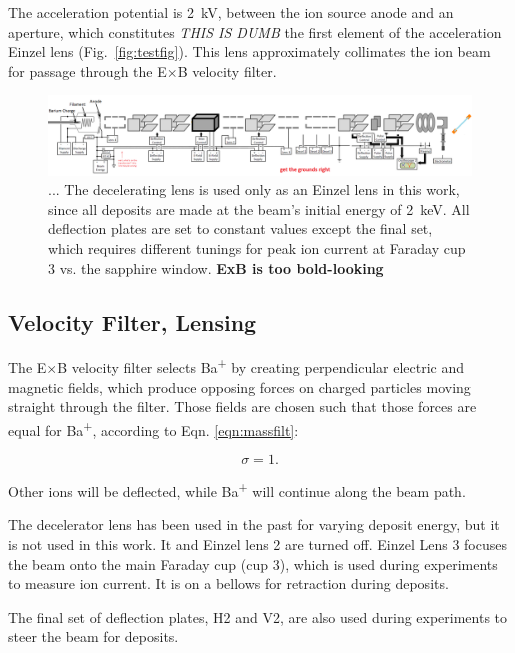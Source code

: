 The acceleration potential is 2~kV, between the ion source anode and an aperture, which constitutes \emph{THIS IS DUMB} the first element of the acceleration Einzel lens (Fig.~\ref{fig:testfig}).  This lens approximately collimates the ion beam for passage through the E$\times$B velocity filter.

\begin{figure}[H]
        \centering
                \includegraphics[width=1.\textwidth]{figures/ionBeam.png}
                \caption{ ... The decelerating lens is used only as an Einzel lens in this work, since all deposits are made at the beam's initial energy of 2~keV.  All deflection plates are set to constant values except the final set, which requires different tunings for peak ion current at Faraday cup 3 vs. the sapphire window.  {\color{red}\textbf{ExB is too bold-looking}}}
\label{fig:ionbeam}
\end{figure}

\subsection{Velocity Filter, Lensing}

The E$\times$B velocity filter selects Ba\textsuperscript{+} by creating perpendicular electric and magnetic fields, which produce opposing forces on charged particles moving straight through the filter.  Those fields are chosen such that those forces are equal for Ba\textsuperscript{+}, according to Eqn. \ref{eqn:massfilt}:

\begin{equation}
\sigma = 1.
\label{eqn:massfilt}
\end{equation}

\noindent
Other ions will be deflected, while Ba\textsuperscript{+} will continue along the beam path.

The decelerator lens has been used in the past for varying deposit energy, but it is not used in this work.  It and Einzel lens 2 are turned off.  Einzel Lens 3 focuses the beam onto the main Faraday cup (cup 3), which is used during experiments to measure ion current.  It is on a bellows for retraction during deposits.

The final set of deflection plates, H2 and V2, are also used during experiments to steer the beam for deposits.

